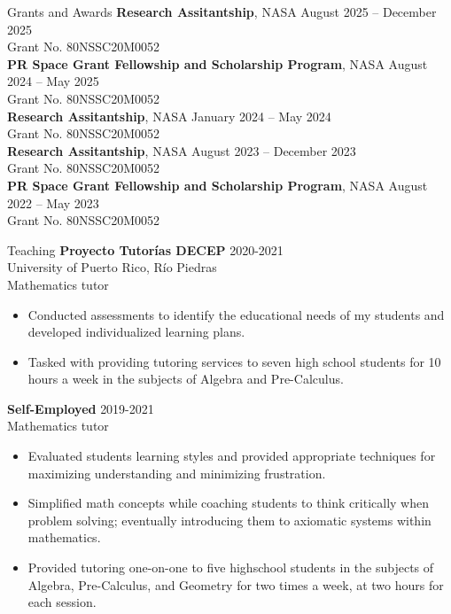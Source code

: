 \documentclass{resume}
\begin{document}
\begin{rSection}{Grants and Awards}
  \textbf{Research Assitantship}, NASA
  \hfill{August 2025 -- December 2025} \\
  Grant No. 80NSSC20M0052 \\

  \textbf{PR Space Grant Fellowship and Scholarship Program}, NASA
  \hfill{August 2024 -- May 2025} \\
  Grant No. 80NSSC20M0052 \\

  \textbf{Research Assitantship}, NASA
  \hfill{January 2024 -- May 2024} \\
  Grant No. 80NSSC20M0052 \\

  \textbf{Research Assitantship}, NASA
  \hfill{August 2023 -- December 2023} \\
  Grant No. 80NSSC20M0052 \\

  \textbf{PR Space Grant Fellowship and Scholarship Program}, NASA
  \hfill{August 2022 -- May 2023} \\
  Grant No. 80NSSC20M0052 \\
\end{rSection}

\begin{rSection}{Teaching}
  \textbf{Proyecto Tutor\'ias DECEP} \hfill{2020-2021} \\
  University of Puerto Rico, R\'io Piedras \\
  Mathematics tutor
  \begin{itemize}
    \item[] Conducted assessments to identify the educational needs of my
      students and developed individualized learning plans.

    \item[] Tasked with providing tutoring services to seven high school
      students for 10 hours a week in the subjects of Algebra and
      Pre-Calculus.
  \end{itemize}

  \textbf{Self-Employed} \hfill{2019-2021} \\
  Mathematics tutor

  \begin{itemize}
    \item[] Evaluated students learning styles and provided appropriate
      techniques for maximizing understanding and minimizing frustration.

    \item[] Simplified math concepts while coaching students to think
      critically when problem solving; eventually introducing them to
      axiomatic systems within mathematics.

    \item[] Provided tutoring one-on-one to five highschool students in the
      subjects of Algebra, Pre-Calculus, and Geometry for two times a
      week, at two hours for each session.
  \end{itemize}
\end{rSection}
\end{document}
